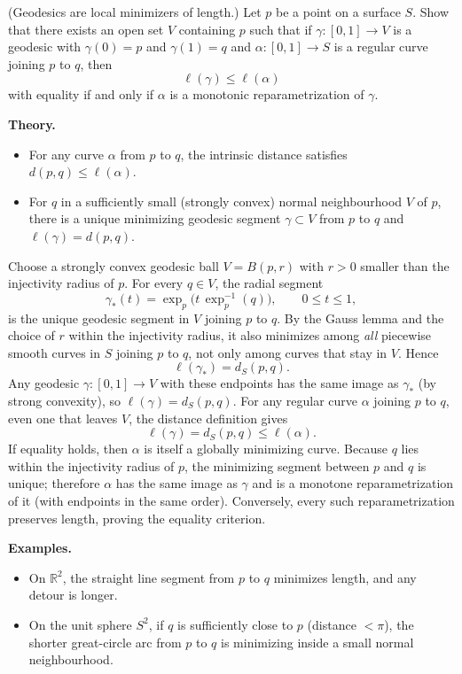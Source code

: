 \begin{problem}
\label{prob:cp-vii-0069}
(Geodesics are local minimizers of length.) Let $p$ be a point on a surface $S$.
Show that there exists an open set $V$ containing $p$ such that if $\gamma:[0,1]\to V$ is a geodesic
with $\gamma(0)=p$ and $\gamma(1)=q$ and $\alpha:[0,1]\to S$ is a regular curve joining $p$ to $q$, then
\[
\ell(\gamma)\le \ell(\alpha)
\]
with equality if and only if $\alpha$ is a monotonic reparametrization of $\gamma$.

\medskip
\textbf{Theory.}
\begin{itemize}
	\item For any curve $\alpha$ from $p$ to $q$, the intrinsic distance satisfies $d(p,q)\le \ell(\alpha)$.
	\item For $q$ in a sufficiently small (strongly convex) normal neighbourhood $V$ of $p$,
	there is a unique minimizing geodesic segment $\gamma\subset V$ from $p$ to $q$ and
	$\ell(\gamma)=d(p,q)$.
\end{itemize}

\medskip
\end{problem}

\begin{solution}
Choose a strongly convex geodesic ball $V=B(p,r)$ with
$r>0$ smaller than the injectivity radius of $p$. For every $q\in V$,
the radial segment
\[
\gamma_*(t)=\exp_p\bigl(t\,\exp_p^{-1}(q)\bigr),\qquad 0\le t\le1,
\]
is the unique geodesic segment in $V$ joining $p$ to $q$. By the
Gauss lemma and the choice of $r$ within the injectivity radius, it
also minimizes among \emph{all} piecewise smooth curves in $S$ joining
$p$ to $q$, not only among curves that stay in $V$. Hence
\[
\ell(\gamma_*)=d_S(p,q).
\]
Any geodesic $\gamma:[0,1]\to V$ with these endpoints has the same
image as $\gamma_*$ (by strong convexity), so
$\ell(\gamma)=d_S(p,q)$. For any regular curve $\alpha$ joining $p$
to $q$, even one that leaves $V$, the distance definition gives
\[
\ell(\gamma)=d_S(p,q)\le\ell(\alpha).
\]
If equality holds, then $\alpha$ is itself a globally minimizing
curve. Because $q$ lies within the injectivity radius of $p$, the
minimizing segment between $p$ and $q$ is unique; therefore $\alpha$
has the same image as $\gamma$ and is a monotone reparametrization of
it (with endpoints in the same order). Conversely, every such
reparametrization preserves length, proving the equality criterion.

\medskip
\textbf{Examples.}
\begin{itemize}
	\item On $\mathbb{R}^2$, the straight line segment from $p$ to $q$ minimizes length, and any detour is longer.
	\item On the unit sphere $S^2$, if $q$ is sufficiently close to $p$ (distance $<\pi$), the shorter great-circle arc
	from $p$ to $q$ is minimizing inside a small normal neighbourhood.
\end{itemize}
\end{solution}

